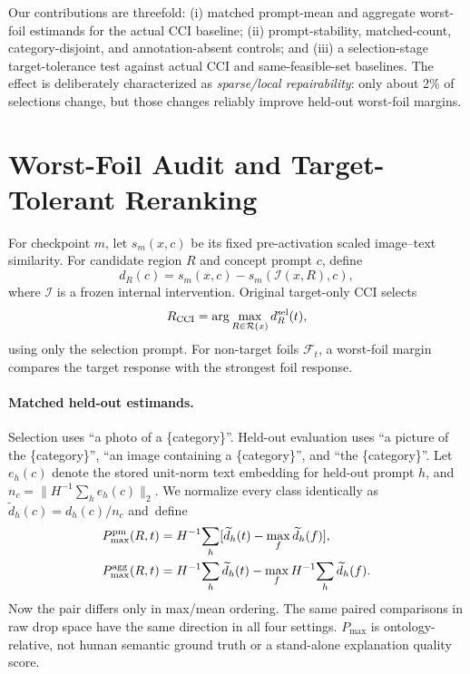 \documentclass[10pt]{article}
\newcommand{\dropv}{d}
\newcommand{\foils}{\mathcal{F}}
\newcommand{\regions}{\mathcal{R}}
\begin{document}
Our contributions are threefold: (i) matched prompt-mean and aggregate
worst-foil estimands for the actual CCI baseline; (ii) prompt-stability,
matched-count, category-disjoint, and annotation-absent controls; and (iii) a
selection-stage target-tolerance test against actual CCI and same-feasible-set
baselines. The effect is deliberately characterized as \emph{sparse/local
repairability}: only about 2\% of selections change, but those changes reliably
improve held-out worst-foil margins.

\section{Worst-Foil Audit and Target-Tolerant Reranking}
For checkpoint $m$, let $s_m(x,c)$ be its fixed pre-activation scaled
image--text similarity. For candidate region $R$ and concept prompt $c$, define
\begin{equation}
\dropv_R(c)=s_m(x,c)-s_m(\mathcal I(x,R),c),
\label{eq:drop}
\end{equation}
where $\mathcal I$ is a frozen internal intervention. Original target-only CCI
selects
\begin{equation}
R_{\rm CCI}=\arg\max_{R\in\regions(x)}\dropv_R^{\rm sel}(t),
\label{eq:cci}
\end{equation}
using only the selection prompt. For non-target foils $\foils_t$, a worst-foil
margin compares the target response with the strongest foil response.

\paragraph{Matched held-out estimands.}
Selection uses ``a photo of a \{category\}''. Held-out evaluation uses
``a picture of the \{category\}'', ``an image containing a \{category\}'', and
``the \{category\}''. Let $e_h(c)$ denote the stored unit-norm text embedding
for held-out prompt $h$, and
$n_c=\|H^{-1}\sum_h e_h(c)\|_2$.
We normalize every class identically as
$\widetilde d_h(c)=d_h(c)/n_c$ and~define
\begin{equation}
\begin{aligned}
P_{\max}^{\rm pm}(R,t)
&=H^{-1}\!\sum_h[\widetilde d_h(t)-\max_f\widetilde d_h(f)],\\
P_{\max}^{\rm agg}(R,t)
&=H^{-1}\!\sum_h\widetilde d_h(t)-
\max_f H^{-1}\!\sum_h\widetilde d_h(f).
\end{aligned}
\label{eq:estimands}
\end{equation}
Now the pair differs only in max/mean ordering. The same paired comparisons in
raw drop space have the same direction in all four settings. $P_{\max}$ is
ontology-relative, not human semantic ground truth or a stand-alone explanation
quality score.
\end{document}
